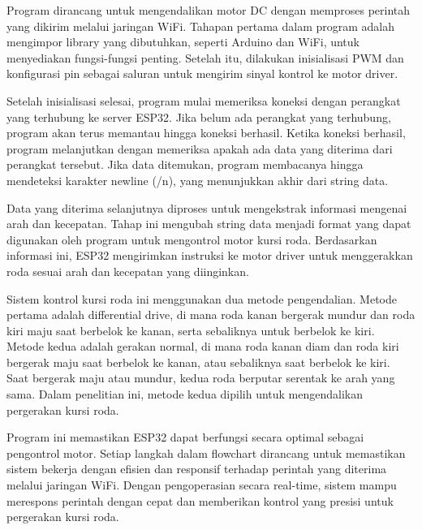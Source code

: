  Program dirancang untuk mengendalikan motor DC dengan memproses perintah yang dikirim melalui jaringan WiFi. Tahapan pertama dalam program adalah mengimpor library yang dibutuhkan, seperti Arduino dan WiFi, untuk menyediakan fungsi-fungsi penting. Setelah itu, dilakukan inisialisasi PWM dan konfigurasi pin sebagai saluran untuk mengirim sinyal kontrol ke motor driver.

Setelah inisialisasi selesai, program mulai memeriksa koneksi dengan perangkat yang terhubung ke server ESP32. Jika belum ada perangkat yang terhubung, program akan terus memantau hingga koneksi berhasil. Ketika koneksi berhasil, program melanjutkan dengan memeriksa apakah ada data yang diterima dari perangkat tersebut. Jika data ditemukan, program membacanya hingga mendeteksi karakter newline (/n), yang menunjukkan akhir dari string data.

Data yang diterima selanjutnya diproses untuk mengekstrak informasi mengenai arah dan kecepatan. Tahap ini mengubah string data menjadi format yang dapat digunakan oleh program untuk mengontrol motor kursi roda. Berdasarkan informasi ini, ESP32 mengirimkan instruksi ke motor driver untuk menggerakkan roda sesuai arah dan kecepatan yang diinginkan.

Sistem kontrol kursi roda ini menggunakan dua metode pengendalian. Metode pertama adalah differential drive, di mana roda kanan bergerak mundur dan roda kiri maju saat berbelok ke kanan, serta sebaliknya untuk berbelok ke kiri. Metode kedua adalah gerakan normal, di mana roda kanan diam dan roda kiri bergerak maju saat berbelok ke kanan, atau sebaliknya saat berbelok ke kiri. Saat bergerak maju atau mundur, kedua roda berputar serentak ke arah yang sama. Dalam penelitian ini, metode kedua dipilih untuk mengendalikan pergerakan kursi roda.

Program ini memastikan ESP32 dapat berfungsi secara optimal sebagai pengontrol motor. Setiap langkah dalam flowchart dirancang untuk memastikan sistem bekerja dengan efisien dan responsif terhadap perintah yang diterima melalui jaringan WiFi. Dengan pengoperasian secara real-time, sistem mampu merespons perintah dengan cepat dan memberikan kontrol yang presisi untuk pergerakan kursi roda\cite{ekatama2024perancangan}.